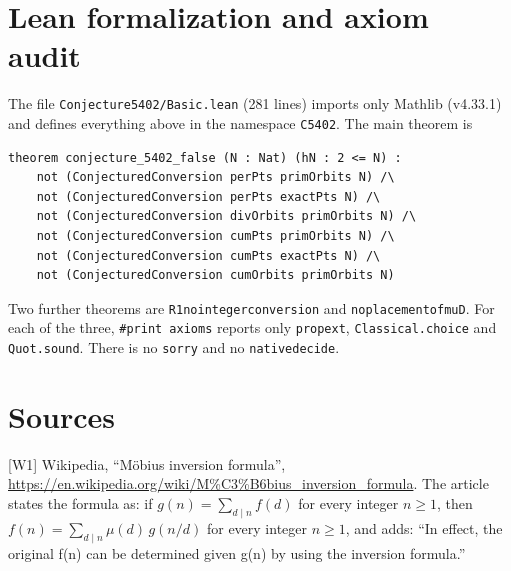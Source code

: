 \documentclass[11pt]{article}
\theoremstyle{definition}
\theoremstyle{remark}
\renewcommand{\_}{\oldus\allowbreak}
\begin{document}
\section{Lean formalization and axiom audit}

The file \texttt{Conjecture5402/Basic.lean} (281 lines) imports only Mathlib (v4.33.1) and defines everything
above in the namespace \texttt{C5402}. The main theorem is
\begin{verbatim}
theorem conjecture_5402_false (N : Nat) (hN : 2 <= N) :
    not (ConjecturedConversion perPts primOrbits N) /\
    not (ConjecturedConversion perPts exactPts N) /\
    not (ConjecturedConversion divOrbits primOrbits N) /\
    not (ConjecturedConversion cumPts primOrbits N) /\
    not (ConjecturedConversion cumPts exactPts N) /\
    not (ConjecturedConversion cumOrbits primOrbits N)
\end{verbatim}
Two further theorems are \texttt{R1\_no\_integer\_conversion} and \texttt{no\_placement\_of\_muD}. For each
of the three, \texttt{\#print axioms} reports only \texttt{propext}, \texttt{Classical.choice} and
\texttt{Quot.sound}. There is no \texttt{sorry} and no \texttt{native\_decide}.

\section*{Sources}
[W1] Wikipedia, ``M\"obius inversion formula'', \url{https://en.wikipedia.org/wiki/M\%C3\%B6bius_inversion_formula}.
The article states the formula as: if $g(n)=\sum_{d\mid n}f(d)$ for every integer $n\ge1$, then
$f(n)=\sum_{d\mid n}\mu(d)\,g(n/d)$ for every integer $n\ge1$, and adds: ``In effect, the original f(n) can
be determined given g(n) by using the inversion formula.''
\end{document}
